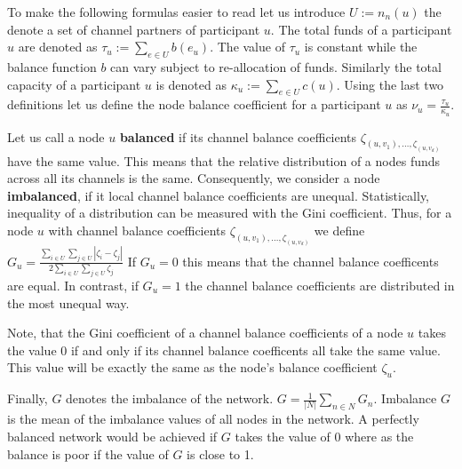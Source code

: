 \documentclass[a4paper]{paper}
\begin{document}
To make the following formulas easier to read let us introduce $U:=n_n(u)$ the denote a set of channel partners of participant $u$.
The total funds of a participant $u$ are denoted as $\tau_u:=\displaystyle{\sum_{e\in U}b(e_u)}$.
The value of $\tau_u$ is constant while the balance function $b$ can vary subject to re-allocation of funds.
Similarly the total capacity of a participant $u$ is denoted as $\kappa_u:=\displaystyle{\sum_{e\in U}c(u)}$.
Using the last two definitions let us define the node balance coefficient for a participant $u$ as $\nu_u = \frac{\tau_u}{\kappa_u}$.

Let us call a node $u$ {\bf balanced} if its channel balance coefficients $\zeta_{(u,v_1),\dots,\zeta_{(u,v_d)}}$ have the same value.
This means that the relative distribution of a nodes funds across all its channels is the same.
Consequently, we consider a node {\bf imbalanced}, if it local channel balance coefficients are unequal.
Statistically, inequality of a distribution can be measured with the Gini coefficient.
Thus, for a node $u$ with channel balance coefficients $\zeta_{(u,v_1),\dots,\zeta_{(u,v_d)}}$ we define $G_u = \frac{\displaystyle{\sum_{i\in U} \sum_{j \in U}} | \zeta_i - \zeta_j |}{2 \displaystyle{\sum_{i \in U} \sum_{j \in U} \zeta_j}}$
If $G_u = 0$ this means that the channel balance coefficents are equal.
In contrast, if $G_u = 1$ the channel balance coefficients are distributed in the most unequal way.

Note, that the Gini coefficient of a channel balance coefficients of a node $u$ takes the value $0$ if and only if its channel balance coefficents all take the same value.
This value will be exactly the same as the node's balance coefficient $\zeta_u$.

Finally, $G$ denotes the imbalance of the network. $G = \displaystyle{\frac{1}{|N|}\sum_{n\in N}G_n}$. Imbalance $G$ is the mean of the imbalance values of all nodes in the network.
A perfectly balanced network would be achieved if $G$ takes the value of $0$ where as the balance is poor if the value of $G$ is close to 1.
\end{document}
